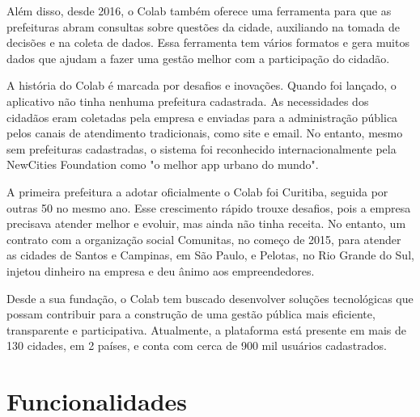 Além disso, desde 2016, o Colab também oferece uma ferramenta para que as prefeituras abram consultas sobre questões da cidade, auxiliando na tomada de decisões e na coleta de dados. Essa ferramenta tem vários formatos e gera muitos dados que ajudam a fazer uma gestão melhor com a participação do cidadão.

A história do Colab é marcada por desafios e inovações. Quando foi lançado, o aplicativo não tinha nenhuma prefeitura cadastrada. As necessidades dos cidadãos eram coletadas pela empresa e enviadas para a administração pública pelos canais de atendimento tradicionais, como site e email. No entanto, mesmo sem prefeituras cadastradas, o sistema foi reconhecido internacionalmente pela NewCities Foundation como "o melhor app urbano do mundo".

A primeira prefeitura a adotar oficialmente o Colab foi Curitiba, seguida por outras 50 no mesmo ano. Esse crescimento rápido trouxe desafios, pois a empresa precisava atender melhor e evoluir, mas ainda não tinha receita. No entanto, um contrato com a organização social Comunitas, no começo de 2015, para atender as cidades de Santos e Campinas, em São Paulo, e Pelotas, no Rio Grande do Sul, injetou dinheiro na empresa e deu ânimo aos empreendedores.

Desde a sua fundação, o Colab tem buscado desenvolver soluções tecnológicas que possam contribuir para a construção de uma gestão pública mais eficiente, transparente e participativa. Atualmente, a plataforma está presente em mais de 130 cidades, em 2 países, e conta com cerca de 900 mil usuários cadastrados.

\section{Funcionalidades}


